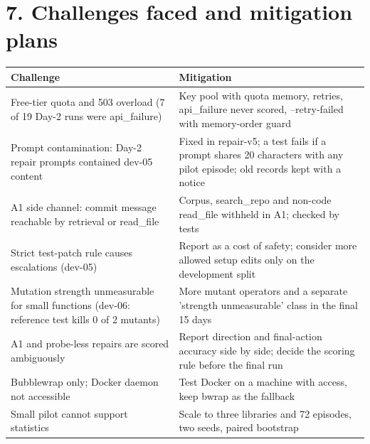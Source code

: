 \documentclass[10pt,a4paper]{article}
\begin{document}
\section*{7. Challenges faced and mitigation plans}
\begin{longtable}{|>{\raggedright\arraybackslash\footnotesize}p{}>{\raggedright\arraybackslash\footnotesize}p{}|}
\hline
\textbf{Challenge} & \textbf{Mitigation} \\ \hline\endhead
Free-tier quota and 503 overload (7 of 19 Day-2 runs were api\_failure) & Key pool with quota memory, retries, api\_failure never scored, --retry-failed with memory-order guard \\ \hline
Prompt contamination: Day-2 repair prompts contained dev-05 content & Fixed in repair-v5; a test fails if a prompt shares 20 characters with any pilot episode; old records kept with a notice \\ \hline
A1 side channel: commit message reachable by retrieval or read\_file & Corpus, search\_repo and non-code read\_file withheld in A1; checked by tests \\ \hline
Strict test-patch rule causes escalations (dev-05) & Report as a cost of safety; consider more allowed setup edits only on the development split \\ \hline
Mutation strength unmeasurable for small functions (dev-06: reference test kills 0 of 2 mutants) & More mutant operators and a separate 'strength unmeasurable' class in the final 15 days \\ \hline
A1 and probe-less repairs are scored ambiguously & Report direction and final-action accuracy side by side; decide the scoring rule before the final run \\ \hline
Bubblewrap only; Docker daemon not accessible & Test Docker on a machine with access, keep bwrap as the fallback \\ \hline
Small pilot cannot support statistics & Scale to three libraries and 72 episodes, two seeds, paired bootstrap \\ \hline
\end{longtable}
\end{document}
